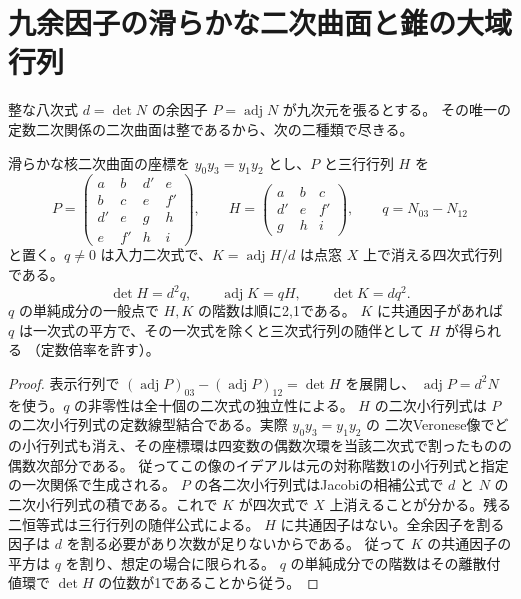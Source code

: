 \section{九余因子の滑らかな二次曲面と錐の大域行列}
\label{sec:nine-cofactor-transfers}
整な八次式 $d=\det N$ の余因子 $P=\operatorname{adj}N$ が九次元を張るとする。
その唯一の定数二次関係の二次曲面は整であるから、次の二種類で尽きる。
\begin{proposition}\label{prop:nine-smooth-transfer}
滑らかな核二次曲面の座標を $y_0y_3=y_1y_2$ とし、$P$ と三行行列 $H$ を
\[
 P=\begin{pmatrix}a&b&d'&e\\b&c&e&f'\\d'&e&g&h\\e&f'&h&i\end{pmatrix},\qquad
 H=\begin{pmatrix}a&b&c\\d'&e&f'\\g&h&i\end{pmatrix},\qquad q=N_{03}-N_{12}
\]
と置く。$q\ne0$ は入力二次式で、$K=\operatorname{adj}H/d$ は点窓 $X$ 上で消える四次式行列である。
\[
             \det H=d^2q,\qquad \operatorname{adj}K=qH,\qquad \det K=dq^2 .
\]
$q$ の単純成分の一般点で $H,K$ の階数は順に2,1である。
$K$ に共通因子があれば $q$ は一次式の平方で、その一次式を除くと三次式行列の随伴として $H$ が得られる
（定数倍率を許す）。
\end{proposition}
\begin{proof}
表示行列で $(\operatorname{adj}P)_{03}-(\operatorname{adj}P)_{12}=\det H$ を展開し、
$\operatorname{adj}P=d^2N$ を使う。$q$ の非零性は全十個の二次式の独立性による。
$H$ の二次小行列式は $P$ の二次小行列式の定数線型結合である。実際 $y_0y_3=y_1y_2$ の
二次Veronese像でどの小行列式も消え、その座標環は四変数の偶数次環を当該二次式で割ったものの偶数次部分である。
従ってこの像のイデアルは元の対称階数1の小行列式と指定の一次関係で生成される。
$P$ の各二次小行列式はJacobiの相補公式で $d$ と $N$ の二次小行列式の積である。これで
$K$ が四次式で $X$ 上消えることが分かる。残る二恒等式は三行行列の随伴公式による。
$H$ に共通因子はない。全余因子を割る因子は $d$ を割る必要があり次数が足りないからである。
従って $K$ の共通因子の平方は $q$ を割り、想定の場合に限られる。
$q$ の単純成分での階数はその離散付値環で $\det H$ の位数が1であることから従う。
\end{proof}

